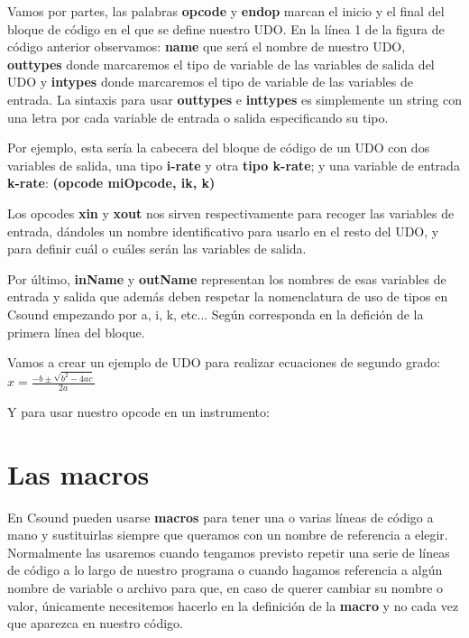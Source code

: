 
Vamos por partes, las palabras \textbf{opcode} y \textbf{endop} marcan el inicio y el final del bloque de código en el que se define nuestro UDO. En la línea 1 de la figura de código anterior observamos: \textbf{name} que será el nombre de nuestro UDO, \textbf{outtypes} donde marcaremos el tipo de variable de las variables de salida del UDO y \textbf{intypes} donde marcaremos el tipo de variable de las variables de entrada. La sintaxis para usar \textbf{outtypes} e \textbf{inttypes} es simplemente un string con una letra por cada variable de entrada o salida especificando su tipo.

Por ejemplo, esta sería la cabecera del bloque de código de un UDO con dos variables de salida, una tipo \textbf{i-rate} y otra \textbf{tipo k-rate}; y una variable de entrada \textbf{k-rate}: \textbf{(opcode miOpcode, ik, k)}

Los opcodes \textbf{xin} y \textbf{xout} nos sirven respectivamente para recoger las variables de entrada, dándoles un nombre identificativo para usarlo en el resto del UDO, y para definir cuál o cuáles serán las variables de salida.

Por último, \textbf{inName} y \textbf{outName} representan los nombres de esas variables de entrada y salida que además deben respetar la nomenclatura de uso de tipos en Csound empezando por a, i, k, etc... Según corresponda en la defición de la primera línea del bloque.

Vamos a crear un ejemplo de UDO para realizar ecuaciones de segundo grado: \( x = \frac {-b \pm \sqrt {b^2 - 4ac}}{2a} \)


Y para usar nuestro opcode en un instrumento:


\pagebreak


\section{Las macros}

En Csound pueden usarse \textbf{macros} para tener una o varias líneas de código a mano y sustituirlas siempre que queramos con un nombre de referencia a elegir. Normalmente las usaremos cuando tengamos previsto repetir una serie de líneas de código a lo largo de nuestro programa o cuando hagamos referencia a algún nombre de variable o archivo para que, en caso de querer cambiar su nombre o valor, únicamente necesitemos hacerlo en la definición de la \textbf{macro} y no cada vez que aparezca en nuestro código.

